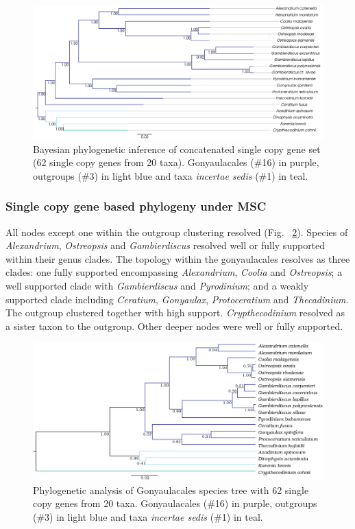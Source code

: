 \documentclass[12pt]{article}
\begin{document}
\begin{figure} 
\includegraphics[scale=.3]{figures/SC-concat-BI.png} 
\caption{Bayesian phylogenetic inference of concatenated single copy gene set (62 single copy genes from 20 taxa). Gonyaulacales (\#16) in purple, outgroups (\#3) in light blue and taxa \textit{incertae sedis} (\#1) in teal.} 
\label{fig:SCconcatBI}
\end{figure} 
\FloatBarrier

\subsubsection*{Single copy gene based phylogeny under MSC}
\FloatBarrier 
All nodes except one within the outgroup clustering resolved (Fig. ~\ref{fig:SCmscBI}). 
Species of \emph{Alexandrium}, \emph{Ostreopsis} and \emph{Gambierdiscus} resolved well or fully supported within their genus clades. 
The topology within the gonyaulacales resolves as three clades: 
one fully supported encompassing \emph{Alexandrium}, \emph{Coolia} and \emph{Ostreopsis}; 
a well supported clade with \emph{Gambierdiscus} and \emph{Pyrodinium}; 
and a weakly supported clade including \emph{Ceratium}, \emph{Gonyaulax}, \emph{Protoceratium} and \emph{Thecadinium}. 
The outgroup clustered together with high support. 
\emph{Crypthecodinium} resolved as a sister taxon to the outgroup. 
Other deeper nodes were well or fully supported.

\begin{figure} 
\includegraphics[scale=.25]{figures/Aug2_20-taxa-combined-fig_MCC_trees.png} 
\caption{Phylogenetic analysis of Gonyaulacales species tree with 62 single copy genes from 20 taxa. Gonyaulacales (\#16) in purple, outgroups (\#3) in light blue and taxa \textit{incertae sedis} (\#1) in teal.} 
\label{fig:SCmscBI}
\end{figure} 
\FloatBarrier
\end{document}
